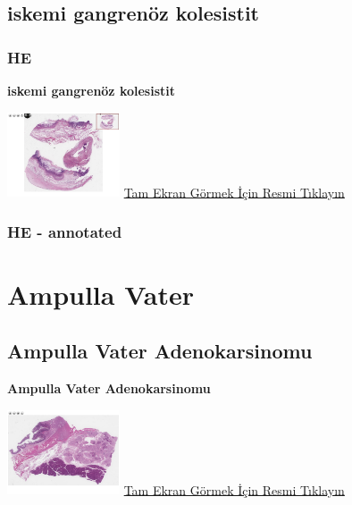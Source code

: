 \documentclass[
  letterpaper,
  DIV=11,
  numbers=noendperiod]{scrreprt}
\begin{document}
\hypertarget{sec-ischemia-gangrenous-cholecystitis}{%
\section{iskemi gangrenöz
kolesistit}\label{sec-ischemia-gangrenous-cholecystitis}}

\hypertarget{he-9}{%
\subsection{HE}\label{he-9}}

\textbf{iskemi gangrenöz kolesistit}

\href{https://images.patolojiatlasi.com/ischemia-gangrenous-cholecystitis/HE.html}{\includegraphics[width=0.25\textwidth,height=\textheight]{./screenshots/ischemia-gangrenous-cholecystitis_screenshot.png}}
\href{https://images.patolojiatlasi.com/ischemia-gangrenous-cholecystitis/HE.html}{Tam
Ekran Görmek İçin Resmi Tıklayın}

\hypertarget{he---annotated-1}{%
\subsection{HE - annotated}\label{he---annotated-1}}

\hypertarget{sec-ampulla-vater}{%
\chapter{Ampulla Vater}\label{sec-ampulla-vater}}

\hypertarget{sec-ampulla-vater-adenokarsinomu}{%
\section{Ampulla Vater
Adenokarsinomu}\label{sec-ampulla-vater-adenokarsinomu}}

\textbf{Ampulla Vater Adenokarsinomu}

\href{https://images.patolojiatlasi.com/ampullary-adenocarcinoma/HE.html}{\includegraphics[width=0.25\textwidth,height=\textheight]{./screenshots/ampullary-adenocarcinoma_screenshot.png}}
\href{https://images.patolojiatlasi.com/ampullary-adenocarcinoma/HE.html}{Tam
Ekran Görmek İçin Resmi Tıklayın}
\end{document}
